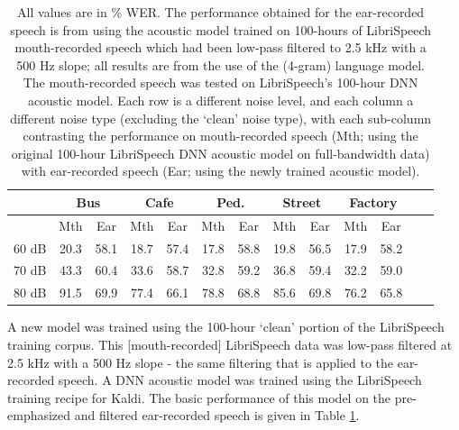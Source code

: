 \begin{table}[h]
\begin{center}
\begin{tabular}{| c || c | c | c | c | c | c | c | c | c | c | c | c |} \hline
      & \multicolumn{2}{|c|}{Bus} & \multicolumn{2}{|c|}{Cafe} & \multicolumn{2}{|c|}{Ped.} & \multicolumn{2}{|c|}{Street} & \multicolumn{2}{|c|}{Factory} \\ \hline
      & Mth & Ear & Mth & Ear & Mth & Ear & Mth & Ear & Mth & Ear \\ \hline\hline
60 dB & 20.3 & 58.1 & 18.7 & 57.4 & 17.8 & 58.8 & 19.8 & 56.5 & 17.9 & 58.2  \\ \hline
70 dB & 43.3 & 60.4 & 33.6 & 58.7 & 32.8 & 59.2 & 36.8 & 59.4 & 32.2 & 59.0  \\ \hline
80 dB & 91.5 & 69.9 & 77.4 & 66.1 & 78.8 & 68.8 & 85.6 & 69.8 & 76.2 & 65.8  \\ \hline
\end{tabular}
\end{center}
\caption{All values are in \% WER. The performance obtained for the ear-recorded speech is from using the acoustic model trained on 100-hours of LibriSpeech mouth-recorded speech which had been low-pass filtered to 2.5 kHz with a 500 Hz slope; all results are from the use of the (4-gram) language model.  The mouth-recorded speech was tested on LibriSpeech's 100-hour DNN acoustic model.  Each row is a different noise level, and each column a different noise type (excluding the `clean' noise type), with each sub-column contrasting the performance on mouth-recorded speech (Mth; using the original 100-hour LibriSpeech DNN acoustic model on full-bandwidth data) with ear-recorded speech (Ear; using the newly trained acoustic model).}\label{tab:retrainedDNN}
\end{table}

A new model was trained using the 100-hour `clean' portion of the LibriSpeech training corpus.  This [mouth-recorded] LibriSpeech data was low-pass filtered at 2.5 kHz with a 500 Hz slope - the same filtering that is applied to the ear-recorded speech.  A DNN acoustic model was trained using the LibriSpeech training recipe for Kaldi. The basic performance of this model on the pre-emphasized and filtered ear-recorded speech is given in Table \ref{tab:retrainedDNN}.


